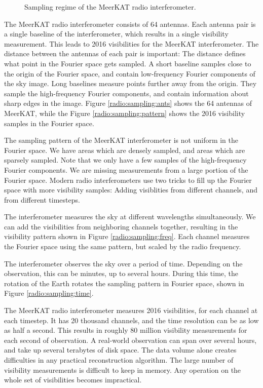 \begin{figure}[!h]
	\caption{Sampling regime of the MeerKAT radio interferometer.}
	\label{intro:sampling}
\end{figure}


The MeerKAT radio interferometer consists of 64 antennas. Each antenna pair is a single baseline of the interferometer, which results in a single visibility measurement. This leads to 2016 visibilities for the MeerKAT interferometer. The distance between the antennas of each pair is important: The distance defines what point in the Fourier space gets sampled. A short baseline samples close to the origin of the Fourier space, and contain low-frequency Fourier components of the sky image. Long baselines measure points further away from the origin. They sample the high-frequency Fourier components, and contain information about sharp edges in the image. Figure \ref{radio:sampling:ants} shows the 64 antennas of MeerKAT, while the Figure \ref{radio:sampling:pattern} shows the 2016 visibility samples in the Fourier space.

The sampling pattern of the MeerKAT interferometer is not uniform in the Fourier space. We have areas which are densely sampled, and areas which are sparsely sampled. Note that we only have a few samples of the high-frequency Fourier components. We are missing measurements from a large portion of the Fourier space. Modern radio interferometers use two tricks to fill up the Fourier space with more visibility samples: Adding visiblities from different channels, and from different timesteps.

The interferometer measures the sky at different wavelengths simultaneously. We can add the visibilities from neighboring channels together, resulting in the visibility pattern shown in Figure \ref{radio:sampling:freq}. Each channel measures the Fourier space using the same pattern, but scaled by the radio frequency.

The interferometer observes the sky over a period of time. Depending on the observation, this can be minutes, up to several hours. During this time, the rotation of the Earth rotates the sampling pattern in Fourier space, shown in Figure \ref{radio:sampling:time}.

The MeerKAT radio interferometer measures 2016 visibilities, for each channel at each timestep. It has 20 thousand channels, and the time resolution can be as low as half a second. This results in roughly 80 million visibility measurements for each second of observation. A real-world observation can span over several hours, and take up several terabytes of disk space. The data volume alone creates difficulties in any practical reconstruction algorithm. The large number of visibility measurements is difficult to keep in memory. Any operation on the whole set of visibilities becomes impractical.

